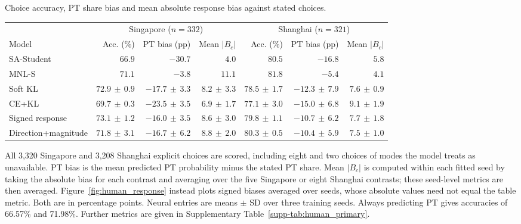\begin{resulttable}
\caption{Choice accuracy, PT share bias and mean absolute response bias against stated choices.}
\label{tab:human_main}
\setlength{\tabcolsep}{3pt}
\renewcommand{\arraystretch}{1.12}
\begin{tabular*}{\linewidth}{@{\extracolsep{\fill}}lrrrrrr@{}}
\toprule
& \multicolumn{3}{c}{Singapore ($n=332$)} & \multicolumn{3}{c}{Shanghai ($n=321$)} \\
\cmidrule(lr){2-4}\cmidrule(l){5-7}
Model & Acc. (\%) & PT bias (pp) & Mean $|B_c|$ & Acc. (\%) & PT bias (pp) & Mean $|B_c|$ \\
\midrule
SA-Student & $66.9$ & $-30.7$ & $4.0$ & $80.5$ & $-16.8$ & $5.8$ \\
MNL-S & $71.1$ & $-3.8$ & $11.1$ & $81.8$ & $-5.4$ & $4.1$ \\
Soft KL & $72.9\,\pm\,0.9$ & $-17.7\,\pm\,3.3$ & $8.2\,\pm\,3.3$ & $78.5\,\pm\,1.7$ & $-12.3\,\pm\,7.9$ & $7.6\,\pm\,0.9$ \\
CE+KL & $69.7\,\pm\,0.3$ & $-23.5\,\pm\,3.5$ & $6.9\,\pm\,1.7$ & $77.1\,\pm\,3.0$ & $-15.0\,\pm\,6.8$ & $9.1\,\pm\,1.9$ \\
Signed response & $73.1\,\pm\,1.2$ & $-16.0\,\pm\,3.5$ & $8.6\,\pm\,3.0$ & $79.8\,\pm\,1.1$ & $-10.7\,\pm\,6.2$ & $7.7\,\pm\,1.8$ \\
Direction+magnitude & $71.8\,\pm\,3.1$ & $-16.7\,\pm\,6.2$ & $8.8\,\pm\,2.0$ & $80.3\,\pm\,0.5$ & $-10.4\,\pm\,5.9$ & $7.5\,\pm\,1.0$ \\
\bottomrule
\end{tabular*}
\par\smallskip\begin{minipage}{\linewidth}\footnotesize
All 3,320 Singapore and 3,208 Shanghai explicit choices are scored, including eight and two choices of modes the model treats as unavailable. PT bias is the mean predicted PT probability minus the stated PT share. Mean $|B_c|$ is computed within each fitted seed by taking the absolute bias for each contrast and averaging over the five Singapore or eight Shanghai contrasts; these seed-level metrics are then averaged. Figure~\ref{fig:human_response} instead plots signed biases averaged over seeds, whose absolute values need not equal the table metric. Both are in percentage points. Neural entries are means $\pm$ SD over three training seeds. Always predicting PT gives accuracies of 66.57\% and 71.98\%. Further metrics are given in Supplementary Table~\ref{supp-tab:human_primary}.
\end{minipage}
\end{resulttable}
